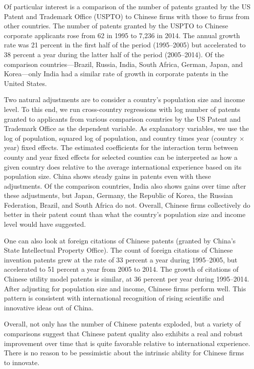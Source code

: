 \documentclass{article}
\begin{document}
    Of particular interest is a comparison of the number of patents granted by the US Patent and Trademark Office (USPTO) to Chinese firms with those to firms from other countries. The number of patents granted by the USPTO to Chinese corporate applicants rose from 62 in 1995 to 7,236 in 2014. The annual growth rate was 21 percent in the first half of the period (1995–2005) but accelerated to 38 percent a year during the latter half of the period (2005–2014). Of the comparison countries—Brazil, Russia, India, South Africa, German, Japan, and Korea—only India had a similar rate of growth in corporate patents in the United States.

    Two natural adjustments are to consider a country’s population size and income level. To this end, we run cross-country regressions with log number of patents granted to applicants from various comparison countries by the US Patent and Trademark Office as the dependent variable. As explanatory variables, we use the log of population, squared log of population, and country times year (country $\times$ year) fixed effects. The estimated coefficients for the interaction term between county and year fixed effects for selected counties can be interpreted as how a given country does relative to the average international experience based on its population size. China shows steady gains in patents even with these adjustments. Of the comparison countries, India also shows gains over time after these adjustments, but Japan, Germany, the Republic of Korea, the Russian Federation, Brazil, and South Africa do not. Overall, Chinese firms collectively do better in their patent count than what the country’s population size and income level would have suggested.

    One can also look at foreign citations of Chinese patents (granted by China’s State Intellectual Property Office). The count of foreign citations of Chinese invention patents grew at the rate of 33 percent a year during 1995–2005, but accelerated to 51 percent a year from 2005 to 2014. The growth of citations of Chinese utility model patents is similar, at 36 percent per year during 1995–2014. After adjusting for population size and income, Chinese firms perform well. This pattern is consistent with international recognition of rising scientific and innovative ideas out of China. 
    
    Overall, not only has the number of Chinese patents exploded, but a variety of comparisons suggest that Chinese patent quality also exhibits a real and robust improvement over time that is quite favorable relative to international experience. There is no reason to be pessimistic about the intrinsic ability for Chinese firms to innovate.
\end{document}
